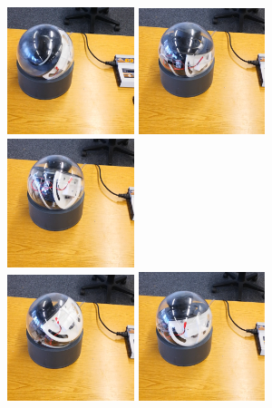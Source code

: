 \documentclass[5p]{elsarticle}
\begin{document}
\begin{figure}
	\centering
	\begin{minipage}[c]{0.45\textwidth}
		\centering
		\includegraphics[width=0.33\textwidth, height=0.33\textwidth]{./images/sphere-frame-1.eps}\hfill
		\includegraphics[width=0.33\textwidth, height=0.33\textwidth]{./images/sphere-frame-2.eps}\hfill
		\includegraphics[width=0.33\textwidth, height=0.33\textwidth]{./images/sphere-frame-3.eps}\\
		\includegraphics[width=0.33\textwidth, height=0.33\textwidth]{./images/sphere-frame-4.eps}\hfill
		\includegraphics[width=0.33\textwidth, height=0.33\textwidth]{./images/sphere-frame-5.eps}\hfill

\end{minipage}
\end{figure}
\end{document}
